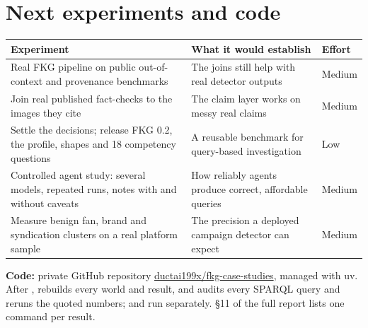 \documentclass[11pt]{article}
\begin{document}
\section*{Next experiments and code}
\begingroup\small\par\smallskip\noindent
\begin{tabularx}{\linewidth}{@{}>{\raggedright\arraybackslash}X>{\raggedright\arraybackslash}X>{\raggedright\arraybackslash}p{1.3cm}@{}}
\toprule
\textbf{Experiment} & \textbf{What it would establish} & \textbf{Effort} \\
\midrule
Real FKG pipeline on public out-of-context and provenance benchmarks & The joins still help with real detector outputs & Medium \\
Join real published fact-checks to the images they cite & The claim layer works on messy real claims & Medium \\
Settle the decisions; release FKG 0.2, the profile, shapes and 18 competency questions & A reusable benchmark for query-based investigation & Low \\
Controlled agent study: several models, repeated runs, notes with and without caveats & How reliably agents produce correct, affordable queries & Medium \\
Measure benign fan, brand and syndication clusters on a real platform sample & The precision a deployed campaign detector can expect & Medium \\
\bottomrule
\end{tabularx}
\par\medskip\endgroup

\textbf{Code:} private GitHub repository \href{https://github.com/ductai199x/fkg-case-studies}{ductai199x/fkg-case-studies}, managed with uv. After ,  rebuilds every world and result, and  audits every SPARQL query and reruns the quoted numbers;  and  run separately. §11 of the full report lists one command per result.
\end{document}
